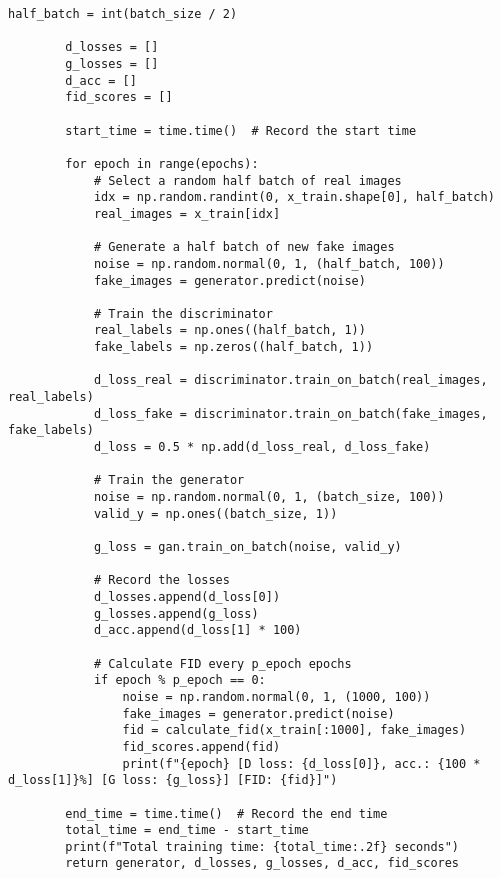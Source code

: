 \begin{lstlisting}[style=mypython, caption= {Explore GAN with 6 Convolutional Layers in Generator \\ and 4 Convolutional Layers in Discriminator}]
        half_batch = int(batch_size / 2)
        
        d_losses = []
        g_losses = []
        d_acc = []
        fid_scores = []
        
        start_time = time.time()  # Record the start time
    
        for epoch in range(epochs):
            # Select a random half batch of real images
            idx = np.random.randint(0, x_train.shape[0], half_batch)
            real_images = x_train[idx]
    
            # Generate a half batch of new fake images
            noise = np.random.normal(0, 1, (half_batch, 100))
            fake_images = generator.predict(noise)
    
            # Train the discriminator
            real_labels = np.ones((half_batch, 1))
            fake_labels = np.zeros((half_batch, 1))
    
            d_loss_real = discriminator.train_on_batch(real_images, real_labels)
            d_loss_fake = discriminator.train_on_batch(fake_images, fake_labels)
            d_loss = 0.5 * np.add(d_loss_real, d_loss_fake)
    
            # Train the generator
            noise = np.random.normal(0, 1, (batch_size, 100))
            valid_y = np.ones((batch_size, 1))
    
            g_loss = gan.train_on_batch(noise, valid_y)
    
            # Record the losses
            d_losses.append(d_loss[0])
            g_losses.append(g_loss)
            d_acc.append(d_loss[1] * 100)
            
            # Calculate FID every p_epoch epochs
            if epoch % p_epoch == 0:
                noise = np.random.normal(0, 1, (1000, 100))
                fake_images = generator.predict(noise)
                fid = calculate_fid(x_train[:1000], fake_images)
                fid_scores.append(fid)
                print(f"{epoch} [D loss: {d_loss[0]}, acc.: {100 * d_loss[1]}%] [G loss: {g_loss}] [FID: {fid}]")
    
        end_time = time.time()  # Record the end time
        total_time = end_time - start_time
        print(f"Total training time: {total_time:.2f} seconds")
        return generator, d_losses, g_losses, d_acc, fid_scores
\end{lstlisting}

